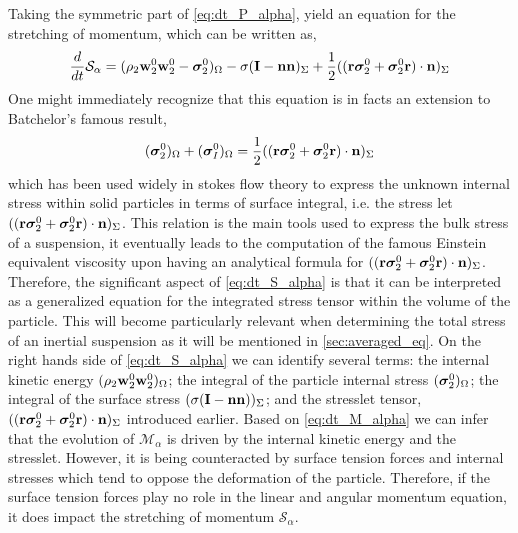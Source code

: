 Taking the symmetric part of \ref{eq:dt_P_alpha}, yield an equation for the stretching of momentum, which can be written as,
\begin{equation}    
    \frac{d}{d t}{\mathcal{S}_\alpha}
    =  ( 
        \rho_2\textbf{w}_2^0 \textbf{w}_2^0
        - \bm{\sigma}_2^0 )_{\Omega}
        - \sigma( \textbf{I}-\textbf{nn} )_{\Sigma}
        + \frac{1}{2}( (\textbf{r}\bm\sigma_2^0+ \bm\sigma_2^0\textbf{r})\cdot \textbf{n} )_{\Sigma}
    \label{eq:dt_S_alpha}
\end{equation}
One might immediately recognize that this equation is in facts an extension to Batchelor’s famous result, 
\begin{equation*}
    ( \bm{\sigma}_2^0 )_{\Omega}
    + ( \bm{\sigma}_I^0 )_{\Omega}
    = \frac{1}{2}( (\textbf{r}\bm\sigma_2^0+ \bm\sigma_2^0\textbf{r})\cdot \textbf{n} )_{\Sigma}
\end{equation*}
which has been used widely in stokes flow theory to express the unknown internal stress within solid particles in terms of surface integral, i.e. the stress let $( (\textbf{r}\bm\sigma_2^0+ \bm\sigma_2^0\textbf{r})\cdot \textbf{n} )_{\Sigma}$.
This relation is the main tools used to express the bulk stress of a suspension, it eventually leads to the computation of the famous Einstein equivalent viscosity upon having an analytical formula for $( (\textbf{r}\bm\sigma_2^0+ \bm\sigma_2^0\textbf{r})\cdot \textbf{n} )_{\Sigma}$. 
Therefore, the significant aspect of \ref{eq:dt_S_alpha} is that it can be interpreted as a generalized equation for the integrated stress tensor within the volume of the particle.
This will become particularly relevant when determining the total stress of an inertial suspension as it will be mentioned in \ref{sec:averaged_eq}.
On the right hands side of \ref{eq:dt_S_alpha} we can identify several terms: 
the internal kinetic energy $( \rho_2\textbf{w}_2^0\textbf{w}_2^0  )_{\Omega}$; 
the integral of the particle internal stress $(  \bm{\sigma}_2^0
  )_{\Omega}$; 
the integral of the surface stress $(  \sigma (\textbf{I}- \textbf{nn})  )_{\Sigma}$; 
and the stresslet tensor, $( (\textbf{r}\bm\sigma_2^0+ \bm\sigma_2^0\textbf{r})\cdot \textbf{n} )_{\Sigma}$ introduced earlier.
Based on \ref{eq:dt_M_alpha} we can infer that the evolution of $\mathcal{M}_\alpha$ is driven by the internal kinetic energy and the stresslet.
However, it is being counteracted by surface tension forces and internal stresses which tend to oppose the deformation of the particle. 
Therefore, if the surface tension forces play no role in the linear and angular momentum equation, it does impact the stretching of momentum $\mathcal{S}_\alpha$.
